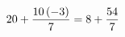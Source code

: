 \documentclass[preview]{standalone}
\begin{document}
\begin{align*}
\special{dvisvgm:raw <g id='unique000'>}20 + \frac{10 \left(-3\right)}{7} = 8 + \frac{54}{7}\special{dvisvgm:raw </g>}
\end{align*}
\end{document}
